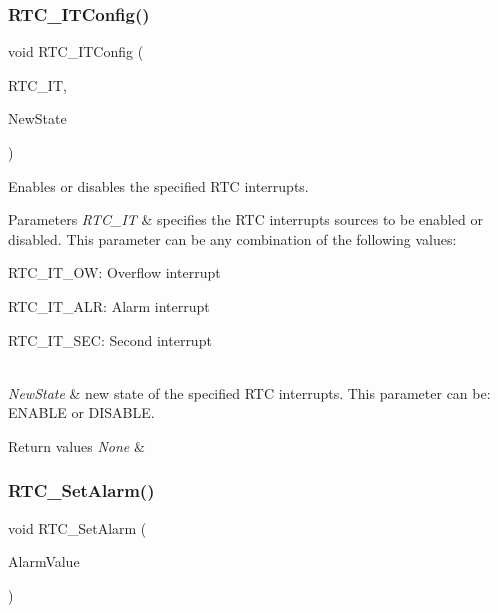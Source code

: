 \subsubsection{\texorpdfstring{RTC\_ITConfig()}{RTC\_ITConfig()}}
{\footnotesize\ttfamily void R\+T\+C\+\_\+\+I\+T\+Config (\begin{DoxyParamCaption}\item[{uint16\+\_\+t}]{R\+T\+C\+\_\+\+IT,  }\item[{\mbox{\hyperlink{group___exported__types_gac9a7e9a35d2513ec15c3b537aaa4fba1}{Functional\+State}}}]{New\+State }\end{DoxyParamCaption})}



Enables or disables the specified R\+TC interrupts. 


\begin{DoxyParams}{Parameters}
{\em R\+T\+C\+\_\+\+IT} & specifies the R\+TC interrupts sources to be enabled or disabled. This parameter can be any combination of the following values\+: \begin{DoxyItemize}
\item R\+T\+C\+\_\+\+I\+T\+\_\+\+OW\+: Overflow interrupt \item R\+T\+C\+\_\+\+I\+T\+\_\+\+A\+LR\+: Alarm interrupt \item R\+T\+C\+\_\+\+I\+T\+\_\+\+S\+EC\+: Second interrupt \end{DoxyItemize}
\\
\hline
{\em New\+State} & new state of the specified R\+TC interrupts. This parameter can be\+: E\+N\+A\+B\+LE or D\+I\+S\+A\+B\+LE. \\
\hline
\end{DoxyParams}

\begin{DoxyRetVals}{Return values}
{\em None} & \\
\hline
\end{DoxyRetVals}
\mbox{\label{group___r_t_c___private___functions_gaec644c636a30ab5e287ba60ffc77132c}} 
\subsubsection{\texorpdfstring{RTC\_SetAlarm()}{RTC\_SetAlarm()}}
{\footnotesize\ttfamily void R\+T\+C\+\_\+\+Set\+Alarm (\begin{DoxyParamCaption}\item[{uint32\+\_\+t}]{Alarm\+Value }\end{DoxyParamCaption})}



